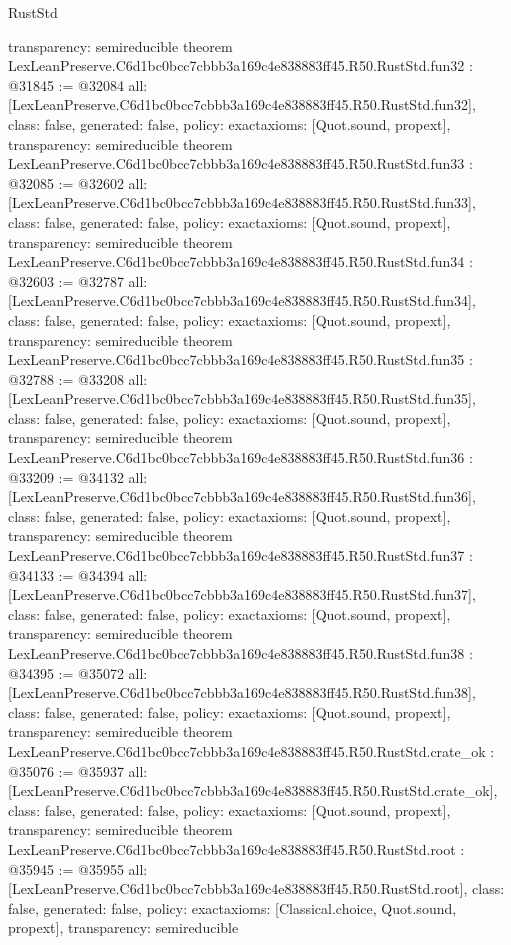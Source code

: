 \begin{lexlean}{RustStd}
\begin{coremodule}
{  transparency: semireducible
}
theorem LexLeanPreserve.C6d1bc0bcc7cbbb3a169c4e838883ff45.R50.RustStd.fun32 : @31845 := @32084 {
  all: [LexLeanPreserve.C6d1bc0bcc7cbbb3a169c4e838883ff45.R50.RustStd.fun32],
  class: false,
  generated: false,
  policy: exact{axioms: [Quot.sound, propext]},
  transparency: semireducible
}
theorem LexLeanPreserve.C6d1bc0bcc7cbbb3a169c4e838883ff45.R50.RustStd.fun33 : @32085 := @32602 {
  all: [LexLeanPreserve.C6d1bc0bcc7cbbb3a169c4e838883ff45.R50.RustStd.fun33],
  class: false,
  generated: false,
  policy: exact{axioms: [Quot.sound, propext]},
  transparency: semireducible
}
theorem LexLeanPreserve.C6d1bc0bcc7cbbb3a169c4e838883ff45.R50.RustStd.fun34 : @32603 := @32787 {
  all: [LexLeanPreserve.C6d1bc0bcc7cbbb3a169c4e838883ff45.R50.RustStd.fun34],
  class: false,
  generated: false,
  policy: exact{axioms: [Quot.sound, propext]},
  transparency: semireducible
}
theorem LexLeanPreserve.C6d1bc0bcc7cbbb3a169c4e838883ff45.R50.RustStd.fun35 : @32788 := @33208 {
  all: [LexLeanPreserve.C6d1bc0bcc7cbbb3a169c4e838883ff45.R50.RustStd.fun35],
  class: false,
  generated: false,
  policy: exact{axioms: [Quot.sound, propext]},
  transparency: semireducible
}
theorem LexLeanPreserve.C6d1bc0bcc7cbbb3a169c4e838883ff45.R50.RustStd.fun36 : @33209 := @34132 {
  all: [LexLeanPreserve.C6d1bc0bcc7cbbb3a169c4e838883ff45.R50.RustStd.fun36],
  class: false,
  generated: false,
  policy: exact{axioms: [Quot.sound, propext]},
  transparency: semireducible
}
theorem LexLeanPreserve.C6d1bc0bcc7cbbb3a169c4e838883ff45.R50.RustStd.fun37 : @34133 := @34394 {
  all: [LexLeanPreserve.C6d1bc0bcc7cbbb3a169c4e838883ff45.R50.RustStd.fun37],
  class: false,
  generated: false,
  policy: exact{axioms: [Quot.sound, propext]},
  transparency: semireducible
}
theorem LexLeanPreserve.C6d1bc0bcc7cbbb3a169c4e838883ff45.R50.RustStd.fun38 : @34395 := @35072 {
  all: [LexLeanPreserve.C6d1bc0bcc7cbbb3a169c4e838883ff45.R50.RustStd.fun38],
  class: false,
  generated: false,
  policy: exact{axioms: [Quot.sound, propext]},
  transparency: semireducible
}
theorem LexLeanPreserve.C6d1bc0bcc7cbbb3a169c4e838883ff45.R50.RustStd.crate_ok : @35076 := @35937 {
  all: [LexLeanPreserve.C6d1bc0bcc7cbbb3a169c4e838883ff45.R50.RustStd.crate_ok],
  class: false,
  generated: false,
  policy: exact{axioms: [Quot.sound, propext]},
  transparency: semireducible
}
theorem LexLeanPreserve.C6d1bc0bcc7cbbb3a169c4e838883ff45.R50.RustStd.root : @35945 := @35955 {
  all: [LexLeanPreserve.C6d1bc0bcc7cbbb3a169c4e838883ff45.R50.RustStd.root],
  class: false,
  generated: false,
  policy: exact{axioms: [Classical.choice, Quot.sound, propext]},
  transparency: semireducible
}


\end{coremodule}
\end{lexlean}
